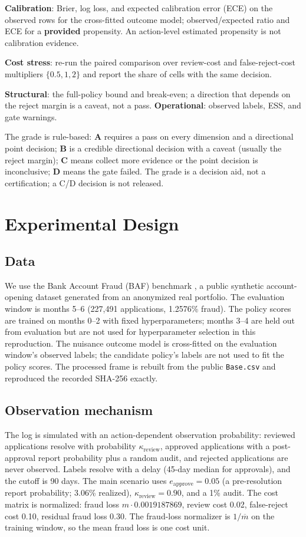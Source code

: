 \documentclass[conference]{IEEEtran}
\begin{document}
\textbf{Calibration}: Brier, log loss, and expected calibration error (ECE) on the observed rows for the cross-fitted outcome model; observed/expected ratio and ECE for a \textbf{provided} propensity. An action-level estimated propensity is not calibration evidence.

\textbf{Cost stress}: re-run the paired comparison over review-cost and false-reject-cost multipliers $\{0.5,1,2\}$ and report the share of cells with the same decision.

\textbf{Structural}: the full-policy bound and break-even; a direction that depends on the reject margin is a caveat, not a pass. \textbf{Operational}: observed labels, ESS, and gate warnings.

The grade is rule-based: \textbf{A} requires a pass on every dimension and a directional point decision; \textbf{B} is a credible directional decision with a caveat (usually the reject margin); \textbf{C} means collect more evidence or the point decision is inconclusive; \textbf{D} means the gate failed. The grade is a decision aid, not a certification; a C/D decision is not released.

\section{Experimental Design}

\subsection{Data}
We use the Bank Account Fraud (BAF) benchmark \cite{jesus2022baf}, a public synthetic account-opening dataset generated from an anonymized real portfolio. The evaluation window is months 5--6 (227,491 applications, 1.2576\% fraud). The policy scores are trained on months 0--2 with fixed hyperparameters; months 3--4 are held out from evaluation but are not used for hyperparameter selection in this reproduction. The nuisance outcome model is cross-fitted on the evaluation window's observed labels; the candidate policy's labels are not used to fit the policy scores. The processed frame is rebuilt from the public \texttt{Base.csv} and reproduced the recorded SHA-256 exactly.

\subsection{Observation mechanism}
The log is simulated with an action-dependent observation probability: reviewed applications resolve with probability $\kappa_{\text{review}}$, approved applications with a post-approval report probability plus a random audit, and rejected applications are never observed. Labels resolve with a delay (45-day median for approvals), and the cutoff is 90 days. The main scenario uses $e_{\text{approve}}=0.05$ (a pre-resolution report probability; 3.06\% realized), $\kappa_{\text{review}}=0.90$, and a 1\% audit. The cost matrix is normalized: fraud loss $m\cdot0.0019187869$, review cost 0.02, false-reject cost 0.10, residual fraud loss 0.30. The fraud-loss normalizer is $1/\overline{m}$ on the training window, so the mean fraud loss is one cost unit.
\end{document}
